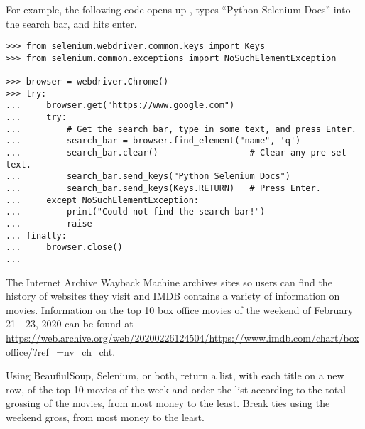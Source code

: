 For example, the following code opens up , types ``Python Selenium Docs'' into the search bar, and hits enter.

\begin{lstlisting}
>>> from selenium.webdriver.common.keys import Keys
>>> from selenium.common.exceptions import NoSuchElementException

>>> browser = webdriver.Chrome()
>>> try:
...     browser.get("https://www.google.com")
...     try:
...         # Get the search bar, type in some text, and press Enter.
...         search_bar = browser.find_element("name", 'q')
...         search_bar.clear()                  # Clear any pre-set text.
...         search_bar.send_keys("Python Selenium Docs")
...         search_bar.send_keys(Keys.RETURN)   # Press Enter.
...     except NoSuchElementException:
...         print("Could not find the search bar!")
...         raise
... finally:
...     browser.close()
...
\end{lstlisting}


\begin{comment} %
To illustrate that using Selenium solves the problem of asynchronously-loaded content, use it to load the soccer statistics page from the previous example.
\begin{lstlisting}
>>> browser = webdriver.Chrome()
>>> soccer_url = "http://www.simplesoccerstats.com/stats/teamstats.php?lge=14&type=goals&season=0"
>>> browser.get(soccer_url)
>>> soccer_soup = BeautifulSoup(browser.page_source)
>>> browser.quit() # Closes the web browser.
>>> print(soccer_soup.find(string="Chicago").parent)
<<<td>Chicago</td>>>
\end{lstlisting}
Notice that there is now a tag containing \li{"Chicago"}.
\end{comment}


\begin{problem} %

The Internet Archive Wayback Machine archives sites so users can find the history of websites they visit and IMDB contains a variety of information on movies. Information on the top 10 box office movies of the weekend of February 21 - 23, 2020 can be found at \url{https://web.archive.org/web/20200226124504/https://www.imdb.com/chart/boxoffice/?ref_=nv_ch_cht}.

Using BeaufiulSoup, Selenium, or both, return a list, with each title on a new row, of the top 10 movies of the week and order the list according to the total grossing of the movies, from most money to the least. Break ties using the weekend gross, from most money to the least.
\end{problem}


